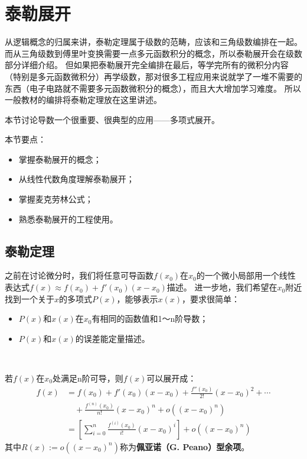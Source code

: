 \section{泰勒展开}

\begin{tcolorbox}
从逻辑概念的归属来讲，泰勒定理属于级数的范畴，应该和三角级数编排在一起。
而从三角级数到傅里叶变换需要一点多元函数积分的概念，所以泰勒展开会在级数部分详细介绍。
但如果把泰勒展开完全编排在最后，等学完所有的微积分内容（特别是多元函数微积分）再学级数，那对很多工程应用来说就学了一堆不需要的东西（电子电路就不需要多元函数微积分的概念），而且大大增加学习难度。
所以一般教材的编排将泰勒定理放在这里讲述。
\end{tcolorbox}

本节讨论导数一个很重要、很典型的应用——多项式展开。

本节要点：
\begin{itemize}
    \item 掌握泰勒展开的概念；
    \item 从线性代数角度理解泰勒展开；
    \item 掌握麦克劳林公式；
    \item 熟悉泰勒展开的工程使用。
\end{itemize}

\subsection{泰勒定理}

之前在讨论微分时，我们将任意可导函数$f\left( x_0 \right) $在$x_0$的一个微小局部用一个线性表达式$f\left( x \right) \approx f\left( x_0 \right) +f'\left( x_0 \right) \left( x-x_0 \right) $描述。
进一步地，我们希望在$x_0$附近找到一个关于$x$的多项式$P\left( x \right) $，能够表示$x\left( x \right) $，要求很简单：
\begin{itemize}
    \item $P\left( x \right) $和$x\left( x \right) $在$x_0$有相同的函数值和1～n阶导数；
    \item $P\left( x \right) $和$x\left( x \right) $的误差能定量描述。
\end{itemize}

~

\begin{theorem}[泰勒（Taylor）定理]
若$f\left( x \right) $在$x_0$处满足n阶可导，则$f\left( x \right) $可以展开成：
\begin{align*}
f\left( x \right) &=f\left( x_0 \right) +f'\left( x_0 \right) \left( x-x_0 \right) +\frac{f''\left( x_0 \right)}{2!}\left( x-x_0 \right) ^2+\cdots \\
&\quad +\frac{f^{\left( n \right)}\left( x_0 \right)}{n!}\left( x-x_0 \right) ^n+o\left( \left( x-x_0 \right) ^n \right) \\
&=\left[ \sum_{i=0}^n{\frac{f^{\left( i \right)}\left( x_0 \right)}{i!}\left( x-x_0 \right) ^i} \right] +o\left( \left( x-x_0 \right) ^n \right)
\end{align*}
其中$R\left( x \right) :=o\left( \left( x-x_0 \right) ^n \right) $称为{\bf 佩亚诺（G. Peano）型余项}。
\end{theorem}

